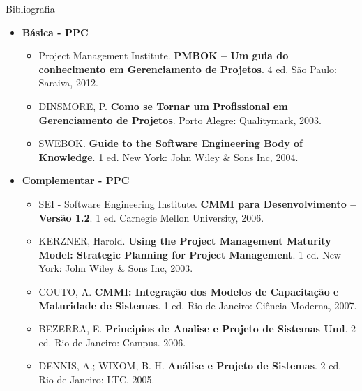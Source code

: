 \documentclass{beamer}
\begin{document}
\begin{frame}{Bibliografia}
    \begin{itemize}
        \item \textbf{Básica - PPC}
        \begin{itemize}
            \justifying
            \scriptsize
            \item Project Management Institute. \textbf{PMBOK – Um guia do conhecimento em Gerenciamento de Projetos}. 4 ed. São Paulo: Saraiva, 2012.
            \item DINSMORE, P. \textbf{Como se Tornar um Profissional em Gerenciamento de Projetos}. Porto Alegre: Qualitymark, 2003.
            \item SWEBOK. \textbf{Guide to the Software Engineering Body of Knowledge}. 1 ed. New York: John Wiley \& Sons Inc, 2004.
        \end{itemize}
        \normalsize
        \item \textbf{Complementar - PPC}
        \begin{itemize}
            \justifying
            \scriptsize
            \item SEI - Software Engineering Institute. \textbf{CMMI para Desenvolvimento – Versão 1.2}. 1 ed. Carnegie Mellon University, 2006.
            \item KERZNER, Harold. \textbf{Using the Project Management Maturity Model: Strategic Planning for Project Management}. 1 ed. New York: John Wiley \& Sons Inc, 2003.
            \item COUTO, A. \textbf{CMMI: Integração dos Modelos de Capacitação e Maturidade de Sistemas}. 1 ed. Rio de Janeiro: Ciência Moderna, 2007.
            \item BEZERRA, E. \textbf{Principios de Analise e Projeto de Sistemas Uml}. 2 ed. Rio de Janeiro: Campus. 2006.
            \item DENNIS, A.; WIXOM, B. H. \textbf{Análise e Projeto de Sistemas}. 2 ed. Rio de Janeiro: LTC, 2005.
        \end{itemize}
    \end{itemize}
\end{frame}
\end{document}
